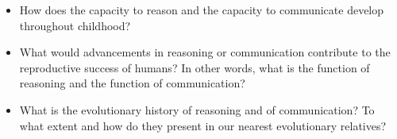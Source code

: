 \begin{itemize}
    \item How does the capacity to reason and the capacity to communicate develop throughout childhood?
    \item What would advancements in reasoning or communication contribute to the reproductive success of humans? In other words, what is the function of reasoning and the function of communication?
    \item What is the evolutionary history of reasoning and of communication? To what extent and how do they present in our nearest evolutionary relatives?
\end{itemize}
